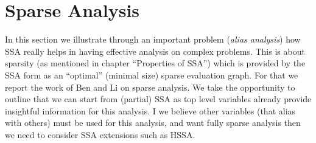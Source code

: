 \section{Sparse Analysis}
In this section we illustrate through an important problem (\emph{alias analysis}) how SSA really helps in having effective analysis on complex problems.
This is about sparsity (as mentioned in chapter ``Properties of SSA'') which is provided by the SSA form as an ``optimal'' (minimal size) sparse evaluation graph.
For that we report the work of Ben and Li on sparse analysis.
We take the opportunity to outline that we can start from (partial) SSA as top level variables already provide insightful information for this analysis.
I we believe other variables (that alias with others) must be used for this analysis, and want fully sparse analysis then we need to consider SSA extensions such as HSSA.





